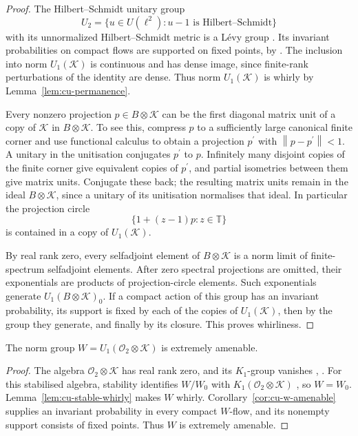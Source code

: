 \begin{proof}
The Hilbert--Schmidt unitary group 
\begin{equation*}
U_2=\{u\in U(\ell^2):u-1\text{ is Hilbert--Schmidt}\}
\end{equation*}
with its unnormalized Hilbert--Schmidt metric is a L\'evy group \cite[Example 2.15]{GiordanoPestov2007}. Its invariant probabilities on compact flows are
supported on fixed points, by \cite[Theorem 1.1 and Remark 1.4]{GlasnerTsirelsonWeiss2005}. The
inclusion into norm $U_1(\mathcal{K})$ is continuous and has dense image,
since finite-rank perturbations of the identity are dense. Thus norm $U_1(\mathcal{K})$ is whirly by Lemma~\ref{lem:cu-permanence}.

Every nonzero projection $p\in B\otimes\mathcal{K}$ can be the first
diagonal matrix unit of a copy of $\mathcal{K}$ in $B\otimes\mathcal{K}$. To
see this, compress $p$ to a sufficiently large canonical finite corner and
use functional calculus to obtain a projection $p^{\prime }$ with $\left\|p-p^{\prime }\right\|<1$. A unitary in the unitisation conjugates $p^{\prime }$ to $p$. Infinitely many disjoint copies of the finite corner
give equivalent copies of $p^{\prime }$, and partial isometries between them
give matrix units. Conjugate these back; the resulting matrix units remain
in the ideal $B\otimes\mathcal{K}$, since a unitary of its unitisation
normalises that ideal. In particular the projection circle 
\begin{equation*}
\{1+(z-1)p:z\in\mathbb{T}\}
\end{equation*}
is contained in a copy of $U_1(\mathcal{K})$.

By real rank zero, every selfadjoint element of $B\otimes\mathcal{K}$ is a
norm limit of finite-spectrum selfadjoint elements. After zero spectral
projections are omitted, their exponentials are products of
projection-circle elements. Such exponentials generate $U_1(B\otimes\mathcal{K})_0$. If a compact action of this group has an invariant probability, its
support is fixed by each of the copies of $U_1(\mathcal{K})$, then by the
group they generate, and finally by its closure. This proves whirliness.
\end{proof}

\begin{theorem}\label{thm:cu-w-ea}
 The norm group $W=U_1(\mathcal{O}_2\otimes\mathcal{K})$ is
extremely amenable.
\end{theorem}

\begin{proof}
The algebra $\mathcal{O}_2\otimes\mathcal{K}$ has real rank zero, and its $K_1$-group vanishes \cite[Theorem 1.2(ii)]{Zhang1992}, \cite{Cuntz1981}. For this
stabilised algebra, stability identifies $W/W_0$ with $K_1(\mathcal{O}_2\otimes\mathcal{K})$ \cite[8.1.1]{Blackadar1998}, so $W=W_0$. Lemma~\ref{lem:cu-stable-whirly} makes $W$ whirly. Corollary~\ref{cor:cu-w-amenable}
supplies an invariant probability in every compact $W$-flow, and its
nonempty support consists of fixed points. Thus $W$ is extremely amenable.
\end{proof}


